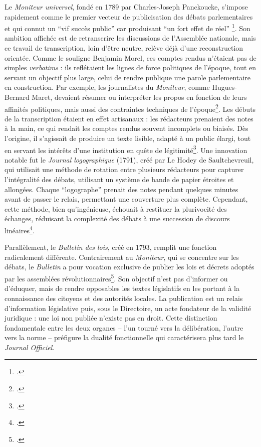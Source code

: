 Le \emph{Moniteur universel}, fondé en 1789 par Charles-Joseph Panckoucke, s’impose rapidement comme le premier vecteur de publicisation des débats parlementaires et qui connut un \enquote{vif succès public} car produisant \enquote{un fort effet de réel} \footcite[][]{coniez}. Son ambition affichée est de retranscrire les discussions de l’Assemblée nationale, mais ce travail de transcription, loin d’être neutre, relève déjà d’une reconstruction orientée. Comme le souligne Benjamin Morel, ces comptes rendus n’étaient pas de simples \emph{verbatims} : ils reflétaient les lignes de force politiques de l’époque, tout en servant un objectif plus large, celui de rendre publique une parole parlementaire en construction. Par exemple, les journalistes du \emph{Moniteur}, comme Hugues-Bernard Maret, devaient résumer ou interpréter les propos en fonction de leurs affinités politiques, mais aussi des contraintes techniques de l’époque\footcite[][]{coniez}. Les débuts de la transcription étaient en effet artisanaux : les rédacteurs prenaient des notes à la main, ce qui rendait les comptes rendus souvent incomplets ou biaisés. Dès l’origine, il s’agissait de produire un texte lisible, adapté à un public élargi, tout en servant les intérêts d’une institution en quête de légitimité\footcite[][]{morelcr}. Une innovation notable fut le \emph{Journal logographique} (1791), créé par Le Hodey de Saultchevreuil, qui utilisait une méthode de rotation entre plusieurs rédacteurs pour capturer l’intégralité des débats, utilisant un système de bande de papier étroites et allongées. Chaque \enquote{logographe} prenait des notes pendant quelques minutes avant de passer le relais, permettant une couverture plus complète. Cependant, cette méthode, bien qu’ingénieuse, échouait à restituer la plurivocité des échanges, réduisant la complexité des débats à une succession de discours linéaires\footcite[][]{coniez}.

Parallèlement, le \emph{Bulletin des lois}, créé en 1793, remplit une fonction radicalement différente. Contrairement au \emph{Moniteur}, qui se concentre sur les débats, le \emph{Bulletin} a pour vocation exclusive de publier les lois et décrets adoptés par les assemblées révolutionnaires\footcite[][]{saudrais}. Son objectif n’est pas d’informer ou d’éduquer, mais de rendre opposables les textes législatifs en les portant à la connaissance des citoyens et des autorités locales. La publication est un relais d’information législative puis, sous le Directoire, un acte fondateur de la validité juridique : une loi non publiée n’existe pas en droit. Cette distinction fondamentale entre les deux organes – l’un tourné vers la délibération, l’autre vers la norme – préfigure la dualité fonctionnelle qui caractérisera plus tard le \emph{Journal Officiel}. 

